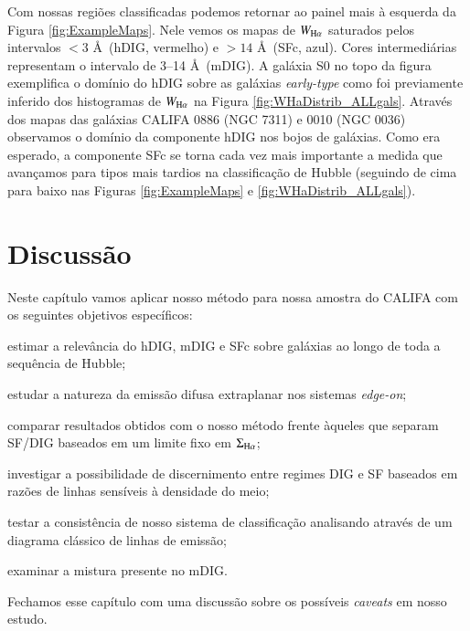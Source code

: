 Com nossas regiões classificadas podemos retornar ao painel mais à esquerda da Figura \ref{fig:ExampleMaps}. Nele vemos os mapas de $W_{\Ha}$ saturados pelos intervalos $< 3$ \AA\ (hDIG, vermelho) e $> 14$ \AA\ (SFc, azul). Cores intermediárias representam o intervalo de 3--14 \AA\ (mDIG). A galáxia S0 no topo da figura exemplifica o domínio do hDIG sobre as galáxias {\em early-type} como foi previamente inferido dos histogramas de $W_{\Ha}$ na Figura \ref{fig:WHaDistrib_ALLgals}. Através dos mapas das galáxias CALIFA 0886 (NGC 7311) e  0010 (NGC 0036) observamos o domínio da componente hDIG nos bojos de galáxias. Como era esperado, a componente SFc se torna cada vez mais importante a medida que avançamos para tipos mais tardios na classificação de Hubble (seguindo de cima para baixo nas Figuras \ref{fig:ExampleMaps} e \ref{fig:WHaDistrib_ALLgals}).




\chapter{Discussão}
\label{sec:DIGdisc}

Neste capítulo vamos aplicar nosso método para nossa amostra do CALIFA com os seguintes objetivos específicos:
\begin{enumerate*}[label=(\roman*)]
    \item estimar a relevância do hDIG, mDIG e SFc sobre galáxias ao longo de toda a sequência de Hubble;
    \item estudar a natureza da emissão difusa extraplanar nos sistemas {\em edge-on};
    \item comparar resultados obtidos com o nosso método frente àqueles que separam SF/DIG baseados em um limite fixo em $\Sigma_{\Ha}$;
    \item investigar a possibilidade de discernimento entre regimes DIG e SF baseados em razões de linhas sensíveis à densidade do meio;
    \item testar a consistência de nosso sistema de classificação analisando através de um diagrama clássico de linhas de emissão;
    \item examinar a mistura presente no mDIG.
\end{enumerate*}
Fechamos esse capítulo com uma discussão sobre os possíveis {\em caveats} em nosso estudo.


